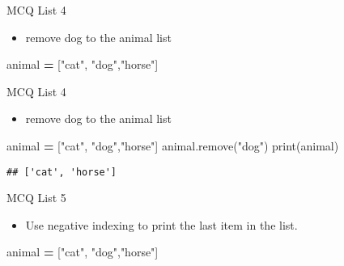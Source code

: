 \documentclass[
  8pt,
  ignorenonframetext,
]{beamer}
\newenvironment{Shaded}{\begin{snugshade}}{\end{snugshade}}
\newcommand{\BuiltInTok}[1]{#1}
\newcommand{\NormalTok}[1]{#1}
\newcommand{\OperatorTok}[1]{\textcolor[rgb]{0.81,0.36,0.00}{\textbf{#1}}}
\newcommand{\StringTok}[1]{\textcolor[rgb]{0.31,0.60,0.02}{#1}}
\providecommand{\tightlist}{%
  \setlength{\itemsep}{0pt}\setlength{\parskip}{0pt}}
\begin{document}
\begin{frame}[fragile]{MCQ List 4}
\protect\hypertarget{mcq-list-4}{}
\begin{itemize}
\tightlist
\item
  remove dog to the animal list
\end{itemize}

\begin{Shaded}
\begin{Highlighting}[]
\NormalTok{animal }\OperatorTok{=}\NormalTok{ [}\StringTok{"cat"}\NormalTok{, }\StringTok{"dog"}\NormalTok{,}\StringTok{"horse"}\NormalTok{]}
\end{Highlighting}
\end{Shaded}
\end{frame}

\begin{frame}[fragile]{MCQ List 4}
\protect\hypertarget{mcq-list-4-1}{}
\begin{itemize}
\tightlist
\item
  remove dog to the animal list
\end{itemize}

\begin{Shaded}
\begin{Highlighting}[]
\NormalTok{animal }\OperatorTok{=}\NormalTok{ [}\StringTok{"cat"}\NormalTok{, }\StringTok{"dog"}\NormalTok{,}\StringTok{"horse"}\NormalTok{]}
\NormalTok{animal.remove(}\StringTok{"dog"}\NormalTok{)}
\BuiltInTok{print}\NormalTok{(animal)}
\end{Highlighting}
\end{Shaded}

\begin{verbatim}
## ['cat', 'horse']
\end{verbatim}
\end{frame}

\begin{frame}[fragile]{MCQ List 5}
\protect\hypertarget{mcq-list-5}{}
\begin{itemize}
\tightlist
\item
  Use negative indexing to print the last item in the list.
\end{itemize}

\begin{Shaded}
\begin{Highlighting}[]
\NormalTok{animal }\OperatorTok{=}\NormalTok{ [}\StringTok{"cat"}\NormalTok{, }\StringTok{"dog"}\NormalTok{,}\StringTok{"horse"}\NormalTok{]}
\end{Highlighting}
\end{Shaded}
\end{frame}
\end{document}
